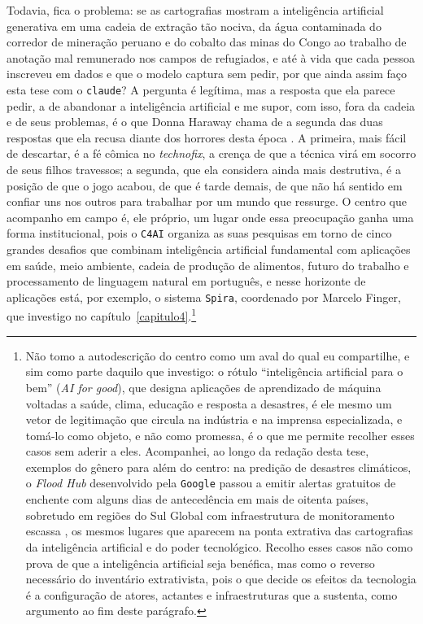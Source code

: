 Todavia, fica o problema: se as cartografias mostram a inteligência artificial generativa em uma cadeia de extração tão nociva, da água contaminada do corredor de mineração peruano e do cobalto das minas do Congo ao trabalho de anotação mal remunerado nos campos de refugiados, e até à vida que cada pessoa inscreveu em dados e que o modelo captura sem pedir, por que ainda assim faço esta tese com o \texttt{claude}? A pergunta é legítima, mas a resposta que ela parece pedir, a de abandonar a inteligência artificial e me supor, com isso, fora da cadeia e de seus problemas, é o que Donna Haraway chama de a segunda das duas respostas que ela recusa diante dos horrores desta época \parencite[pp.~3--4]{Haraway2016Staying}. A primeira, mais fácil de descartar, é a fé cômica no \emph{technofix}, a crença de que a técnica virá em socorro de seus filhos travessos; a segunda, que ela considera ainda mais destrutiva, é a posição de que o jogo acabou, de que é tarde demais, de que não há sentido em confiar uns nos outros para trabalhar por um mundo que ressurge. O centro que acompanho em campo é, ele próprio, um lugar onde essa preocupação ganha uma forma institucional, pois o \texttt{C4AI} organiza as suas pesquisas em torno de cinco grandes desafios que combinam inteligência artificial fundamental com aplicações em saúde, meio ambiente, cadeia de produção de alimentos, futuro do trabalho e processamento de linguagem natural em português, e nesse horizonte de aplicações está, por exemplo, o sistema \texttt{Spira}, coordenado por Marcelo Finger, que investigo no capítulo~\ref{capitulo4}.\footnote{Não tomo a autodescrição do centro como um aval do qual eu compartilhe, e sim como parte daquilo que investigo: o rótulo \enquote{inteligência artificial para o bem} (\textit{AI for good}), que designa aplicações de aprendizado de máquina voltadas a saúde, clima, educação e resposta a desastres, é ele mesmo um vetor de legitimação que circula na indústria e na imprensa especializada, e tomá-lo como objeto, e não como promessa, é o que me permite recolher esses casos sem aderir a eles. Acompanhei, ao longo da redação desta tese, exemplos do gênero para além do centro: na predição de desastres climáticos, o \emph{Flood Hub} desenvolvido pela \texttt{Google} passou a emitir alertas gratuitos de enchente com alguns dias de antecedência em mais de oitenta países, sobretudo em regiões do Sul Global com infraestrutura de monitoramento escassa \parencite{GoogleBlog2026FloodHub}, os mesmos lugares que aparecem na ponta extrativa das cartografias da inteligência artificial e do poder tecnológico. Recolho esses casos não como prova de que a inteligência artificial seja benéfica, mas como o reverso necessário do inventário extrativista, pois o que decide os efeitos da tecnologia é a configuração de atores, actantes e infraestruturas que a sustenta, como argumento ao fim deste parágrafo.}

